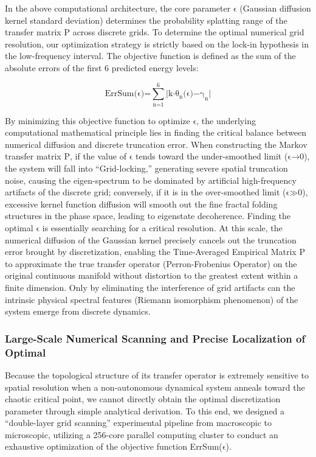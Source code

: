 In the above computational architecture, the core parameter \(\text{ϵ}\)
(Gaussian diffusion kernel standard deviation) determines the
probability splatting range of the transfer matrix \(\text{P}\) across
discrete grids. To determine the optimal numerical grid resolution, our
optimization strategy is strictly based on the lock-in hypothesis in the
low-frequency interval. The objective function is defined as the sum of
the absolute errors of the first 6 predicted energy levels:

\[\text{ErrSum(ϵ)=}\sum_{\text{n}\text{=1}}^{\text{6}}\text{|}\text{k}\text{⋅}\text{θ}_{\text{n}}\text{(ϵ)−}\text{γ}_{\text{n}}\text{|}\]

By minimizing this objective function to optimize \(\text{ϵ}\), the
underlying computational mathematical principle lies in finding the
critical balance between numerical diffusion and discrete truncation
error. When constructing the Markov transfer matrix \(\text{P}\), if the
value of \(\text{ϵ}\) tends toward the under-smoothed limit
(\(\text{ϵ→0}\)), the system will fall into ``Grid-locking,'' generating
severe spatial truncation noise, causing the eigen-spectrum to be
dominated by artificial high-frequency artifacts of the discrete grid;
conversely, if it is in the over-smoothed limit (\(\text{ϵ≫0}\)),
excessive kernel function diffusion will smooth out the fine fractal
folding structures in the phase space, leading to eigenstate
decoherence. Finding the optimal \(\text{ϵ}\) is essentially searching
for a critical resolution. At this scale, the numerical diffusion of the
Gaussian kernel precisely cancels out the truncation error brought by
discretization, enabling the Time-Averaged Empirical Matrix \(\text{P}\)
to approximate the true transfer operator (Perron-Frobenius Operator) on
the original continuous manifold without distortion to the greatest
extent within a finite dimension. Only by eliminating the interference
of grid artifacts can the intrinsic physical spectral features (Riemann
isomorphism phenomenon) of the system emerge from discrete dynamics.

\subsubsection*{Large-Scale Numerical Scanning and Precise Localization of Optimal}

Because the topological structure of its transfer operator is extremely
sensitive to spatial resolution when a non-autonomous dynamical system
anneals toward the chaotic critical point, we cannot directly obtain the
optimal discretization parameter through simple analytical derivation.
To this end, we designed a ``double-layer grid scanning'' experimental
pipeline from macroscopic to microscopic, utilizing a 256-core parallel
computing cluster to conduct an exhaustive optimization of the objective
function ErrSum(\(\text{ϵ}\)).

